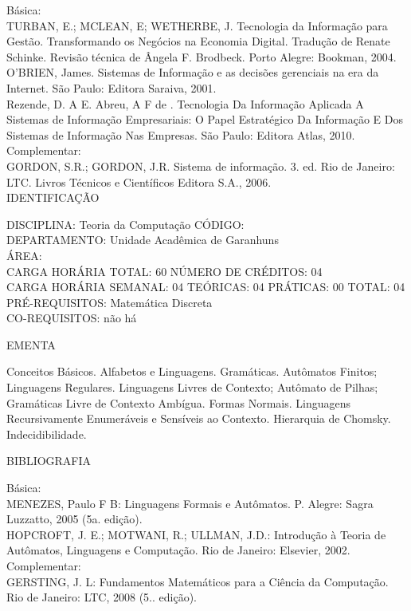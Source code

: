 \documentclass[
	12pt,				%
	openright,			%
  oneside,     %
	a4paper,			%
	chapter=TITLE,		%
	english,			%
	french,				%
	spanish,			%
	brazil				%
	]{abntex2}
\begin{document}
\begin{apendicesenv}
Básica:\\
TURBAN, E.; MCLEAN, E; WETHERBE, J. Tecnologia da Informação para
Gestão. Transformando os Negócios na Economia Digital. Tradução de
Renate Schinke. Revisão técnica de Ângela F. Brodbeck. Porto Alegre:
Bookman, 2004.\\
O'BRIEN, James. Sistemas de Informação e as decisões
gerenciais na era da Internet. São Paulo: Editora Saraiva, 2001.\\
Rezende, D. A E. Abreu, A F de . Tecnologia Da Informação Aplicada A
Sistemas de Informação Empresariais: O Papel Estratégico Da Informação
E Dos Sistemas de Informação Nas Empresas. São Paulo: Editora Atlas, 2010.\\
Complementar:\\
GORDON, S.R.; GORDON, J.R. Sistema de informação. 3. ed. Rio de Janeiro:
LTC. Livros Técnicos e Científicos Editora S.A., 2006.\\


\newpage IDENTIFICAÇÃO

DISCIPLINA: Teoria da Computação CÓDIGO:\\
DEPARTAMENTO: Unidade Acadêmica de Garanhuns\\
ÁREA: \\
CARGA HORÁRIA TOTAL: 60 NÚMERO DE CRÉDITOS: 04\\
CARGA HORÁRIA SEMANAL: 04 TEÓRICAS: 04 PRÁTICAS: 00 TOTAL: 04\\
PRÉ-REQUISITOS: Matemática Discreta\\
CO-REQUISITOS: não há

EMENTA 

Conceitos Básicos. Alfabetos e Linguagens. Gramáticas. Autômatos
Finitos; Linguagens Regulares. Linguagens Livres de Contexto; Autômato
de Pilhas; Gramáticas Livre de Contexto Ambígua. Formas Normais.
Linguagens Recursivamente Enumeráveis e Sensíveis ao Contexto.
Hierarquia de Chomsky. Indecidibilidade.

BIBLIOGRAFIA 

Básica:\\
MENEZES, Paulo F B: Linguagens Formais e Autômatos. P. Alegre: Sagra
Luzzatto, 2005 (5a. edição).\\
HOPCROFT, J. E.; MOTWANI, R.; ULLMAN, J.D.: Introdução à Teoria de
Autômatos, Linguagens e Computação. Rio de Janeiro: Elsevier, 2002.\\
Complementar:\\
GERSTING, J. L: Fundamentos Matemáticos para a Ciência da Computação.
Rio de Janeiro: LTC, 2008 (5.. edição).\\


\end{apendicesenv}
\end{document}
